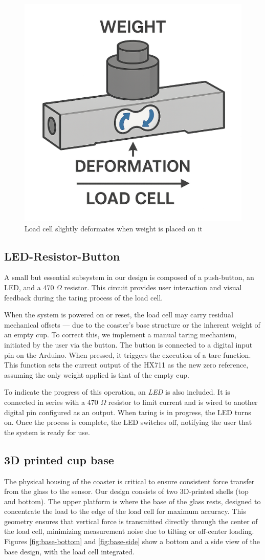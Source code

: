 \begin{figure}[H]
    \centering
    \includegraphics[width=0.35\linewidth]{load cell images/load cell deformation no back.png}
    \caption{Load cell slightly deformates when weight is placed on it}
    \label{fig:loadcell_deforms}
\end{figure}

\subsection{LED-Resistor-Button}
A small but essential subsystem in our design is composed of a push-button, an LED, and a 470 $\Omega$ resistor. This circuit provides user interaction and visual feedback during the taring process of the load cell.

When the system is powered on or reset, the load cell may carry residual mechanical offsets — due to the coaster’s base structure or the inherent weight of an empty cup. To correct this, we implement a manual taring mechanism, initiated by the user via the button.
The button is connected to a digital input pin on the Arduino. When pressed, it triggers the execution of a tare function. This function sets the current output of the HX711 as the new zero reference, assuming the only weight applied is that of the empty cup.

To indicate the progress of this operation, an \textit{LED} is also included. It is connected in series with a 470 $\Omega$ resistor to limit current and is wired to another digital pin configured as an output. When taring is in progress, the LED turns on. Once the process is complete, the LED switches off, notifying the user that the system is ready for use.

\subsection{3D printed cup base}
The physical housing of the coaster is critical to ensure consistent force transfer from the glass to the sensor. Our design consists of two %
3D-printed shells (top and bottom). The upper platform is where the base of the glass rests, designed to %
concentrate the load to the edge of the load cell for maximum accuracy.
This geometry ensures that vertical force is transmitted directly through the center of the load cell, minimizing measurement noise due to tilting or off-center loading. Figures \ref{fig:base-bottom} and \ref{fig:base-side} show a bottom and a side view of the base design, with the load cell integrated.

